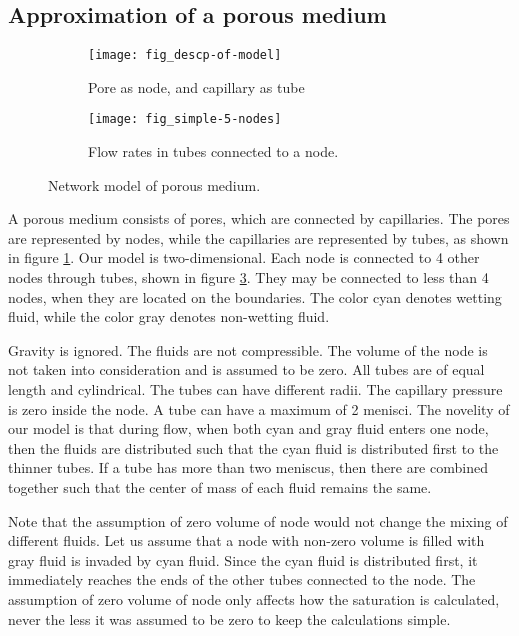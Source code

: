 \subsection{Approximation of a porous medium} \label{sec:approx-porous-medium}

	\begin{figure}[H]
		\centering
		\begin{subfigure}{0.55\textwidth}
			\centering
			\texttt{[image: fig\_descp-of-model]}
			\caption{Pore as node, and capillary as tube}
			\label{fig:descp-of-model}
		\end{subfigure}
		\begin{subfigure}{0.4\textwidth}
			\centering
			\texttt{[image: fig\_simple-5-nodes]}
			\caption{Flow rates in tubes connected to a node.}
			\label{fig:simple-5-nodes}
		\end{subfigure}
		\caption{Network model of porous medium.}
	\end{figure}
	
	A porous medium consists of pores, which are connected by capillaries. The pores are represented by nodes, while the capillaries are represented by tubes, as shown in figure \ref{fig:descp-of-model}. Our model is two-dimensional. Each node is connected to 4 other nodes through tubes, shown in figure \ref{fig:simple-5-nodes}. They may be connected to less than 4 nodes, when they are located on the boundaries. The color cyan denotes wetting fluid, while the color gray denotes non-wetting fluid.
		
	Gravity is ignored. The fluids are not compressible. The volume of the node is not taken into consideration and is assumed to be zero. All tubes are of equal length and cylindrical. The tubes can have different radii. The capillary pressure is zero inside the node. A tube can have a maximum of 2 menisci. The novelity of our model is that during flow, when both cyan and gray fluid enters one node, then the fluids are distributed such that the cyan fluid is distributed first to the thinner tubes. If a tube has more than two meniscus, then there are combined together such that the center of mass of each fluid remains the same.
	
	Note that the assumption of zero volume of node would not change the mixing of different fluids. Let us assume that a node with non-zero volume is filled with gray fluid is invaded by cyan fluid. Since the cyan fluid is distributed first, it immediately reaches the ends of the other tubes connected to the node. The assumption of zero volume of node only affects how the saturation is calculated, never the less it was assumed to be zero to keep the calculations simple.


